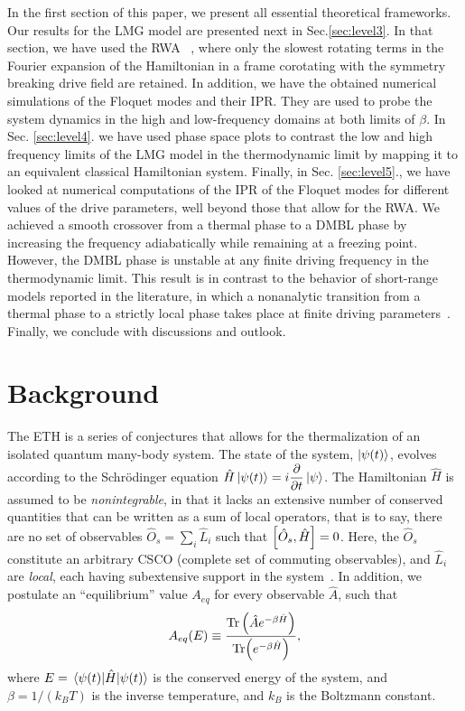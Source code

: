 \documentclass[%
reprint,
superscriptaddress,
amsmath,amssymb,
aps,
prb,
showkeys,
]{revtex4-2}
\begin{document}
In the first section of this paper, we present all essential theoretical frameworks. Our results for the LMG model are presented next in Sec.\ref{sec:level3}. In that section, we have used the RWA ~\cite{fujii_introduction_2017}, where only the slowest rotating terms in the Fourier expansion of the Hamiltonian in a frame corotating with the symmetry breaking drive field are retained. In addition, we have the obtained {numerical simulations of} the Floquet modes and their IPR. They are used to probe the system dynamics in the high and low-frequency domains at both limits of $\beta$. In Sec. \ref{sec:level4}. we have used phase space plots to contrast the low and high frequency limits of the LMG model in the thermodynamic limit by mapping it to an equivalent classical Hamiltonian system. Finally, in Sec. \ref{sec:level5}., we have looked at numerical computations of the IPR of the Floquet modes for different values of the drive parameters, well beyond those that allow for the RWA. We achieved a smooth crossover from a thermal phase to a DMBL phase by increasing the frequency adiabatically while remaining at a freezing point. However, the DMBL phase is unstable at any finite driving frequency in the thermodynamic limit. This result is in contrast to the behavior of short-range models reported in the literature, in which a nonanalytic transition from a thermal phase to a strictly local phase takes place at finite driving parameters~\cite{asmi:floquet:thermalization}. Finally, we conclude with discussions and outlook.

\section{\label{sec:background} Background}

The ETH is a series of conjectures that allows for the thermalization of an isolated quantum many-body system. The state of the system, $\ket{\psi(t)}$, evolves according to the Schr\"odinger equation $\hat{H}\ket{\psi(t)} = i\displaystyle\frac{\partial}{\partial t}\ket{\psi}$. The Hamiltonian $\hat{H}$ is assumed to be \textit{nonintegrable}, in that  {it lacks an extensive number of conserved quantities that can be written as a sum of local operators, that is to say, there are no set of observables   $\hat{O}_s = \sum_i \hat{L}_i$ such that $\comm{\hat{O}_s}{\hat{H}}=0$. Here, the $\hat{O}_s$ constitute an arbitrary CSCO (complete set of commuting observables), and $\hat{L}_i$ are \textit{local}, each having subextensive support in the system}~\cite{Sutherland2004}. In addition, we postulate an ``equilibrium'' value $A_{eq}$ for every observable $\hat{A}$, such that
\begin{equation}
	\label{eq:aeq}
	A_{eq}(E)\equiv \frac{\Tr \left(\hat{A}e^{-\beta \hat{H}}\right)}{\Tr(e^{-\beta \hat{H}})},
\end{equation}
where $E=\expval{\hat{H}}{\psi(t)}$ is the conserved energy of the system, and $\beta = 1/(k_B T)$ is the inverse temperature, and $k_B$ is the Boltzmann constant.
\end{document}
